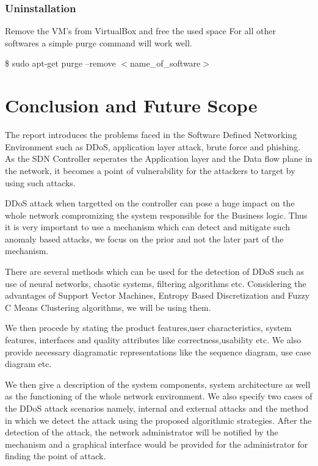 \documentclass[12pt,a4paper,final]{report}
\begin{document}
\subsection{Uninstallation}
Remove the VM's from VirtualBox and free the used space
For all other softwares a simple purge command will work well.
\begin{center}
\$ sudo apt-get purge --remove $<$name\_of\_software$>$
\end{center}
\newpage

\chapter{Conclusion and Future Scope}
\thispagestyle{empty}
\newpage
The report introduces the problems faced in the Software Defined Networking Environment such as DDoS,
application layer attack, brute force and phishing. As the SDN Controller seperates the Application layer and 
the Data flow plane in the network, it becomes a point of vulnerability for the attackers to target by using 
such attacks.

DDoS attack when targetted on the controller can pose a huge impact on the whole network compromizing the system 
responsible for the Business logic. Thus it is very important to use a mechanism which can detect and mitigate such 
anomaly based attacks, we focus on the prior and not the later part of the mechanism.

There are several methods which can be used for the detection of DDoS such as use of neural networks, chaotic 
systems, filtering algorithms etc. Considering the advantages of Support Vector Machines, Entropy Based Discretization and Fuzzy C Means Clustering algorithms, we will be using them.

We then procede by stating the product features,user characteristics, system features, interfaces and quality 
attributes like correctness,usability etc. We also provide necessary diagramatic representations like the 
sequence diagram, use case diagram etc.

We then give a description of the system components, system architecture as well as the functioning of the whole
network environment. We also specify two cases of the DDoS attack scenarios namely, internal and external attacks and the method in which we detect the attack using the proposed algorithmic strategies. After the detection of the attack, the network administrator will be notified by the mechanism and a graphical interface would be provided for the administrator for finding the point of attack.
\end{document}

